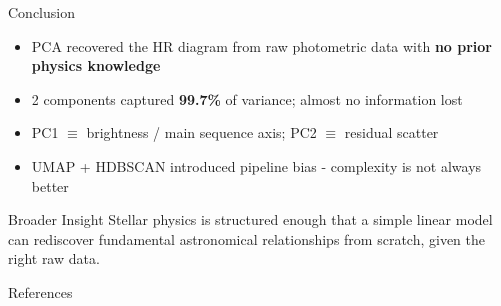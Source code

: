 \documentclass[aspectratio=169]{beamer}
\begin{document}
\begin{frame}{Conclusion}
  \begin{itemize}
    \item PCA recovered the HR diagram from raw photometric data with \textbf{no prior physics knowledge}
    \item 2 components captured \textbf{99.7\%} of variance; almost no information lost
    \item PC1 $\equiv$ brightness / main sequence axis; PC2 $\equiv$ residual scatter
    \item UMAP + HDBSCAN introduced pipeline bias - complexity is not always better
  \end{itemize}
  \vspace{1em}
  \begin{block}{Broader Insight}
    Stellar physics is structured enough that a simple linear model can rediscover fundamental
    astronomical relationships from scratch, given the right raw data.
  \end{block}
\end{frame}

\begin{frame}{References}
    \scriptsize
    \setlength{\bibsep}{16pt}
    
    
\end{frame}
\end{document}
